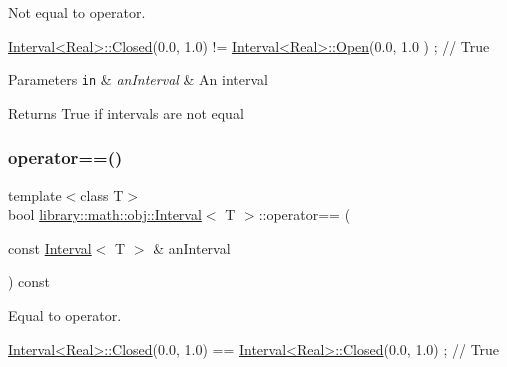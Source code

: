 Not equal to operator. 


\begin{DoxyCode}
\hyperlink{classlibrary_1_1math_1_1obj_1_1_interval_aae8bb2b89af450729338d48563def4d7}{Interval<Real>::Closed}(0.0, 1.0) != \hyperlink{classlibrary_1_1math_1_1obj_1_1_interval_add0e1114a0c153da7a928fd059a08919}{Interval<Real>::Open}(0.0, 1.0
      ) ; \textcolor{comment}{// True}
\end{DoxyCode}



\begin{DoxyParams}[1]{Parameters}
\mbox{\tt in}  & {\em an\+Interval} & An interval \\
\hline
\end{DoxyParams}
\begin{DoxyReturn}{Returns}
True if intervals are not equal 
\end{DoxyReturn}
\mbox{\label{classlibrary_1_1math_1_1obj_1_1_interval_a99b12768e33b75bf87ab656b92c03e98}} 
\subsubsection{\texorpdfstring{operator==()}{operator==()}}
{\footnotesize\ttfamily template$<$class T$>$ \\
bool \hyperlink{classlibrary_1_1math_1_1obj_1_1_interval}{library\+::math\+::obj\+::\+Interval}$<$ T $>$\+::operator== (\begin{DoxyParamCaption}\item[{const \hyperlink{classlibrary_1_1math_1_1obj_1_1_interval}{Interval}$<$ T $>$ \&}]{an\+Interval }\end{DoxyParamCaption}) const}



Equal to operator. 


\begin{DoxyCode}
\hyperlink{classlibrary_1_1math_1_1obj_1_1_interval_aae8bb2b89af450729338d48563def4d7}{Interval<Real>::Closed}(0.0, 1.0) == \hyperlink{classlibrary_1_1math_1_1obj_1_1_interval_aae8bb2b89af450729338d48563def4d7}{Interval<Real>::Closed}(0.0,
       1.0) ; \textcolor{comment}{// True}
\end{DoxyCode}



